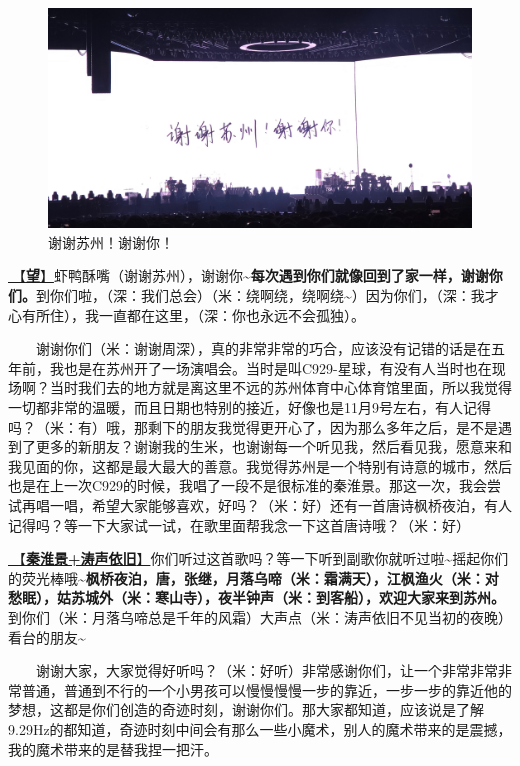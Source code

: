\documentclass[]{ctexbook}
\begin{document}
\begin{figure}

{\centering \includegraphics[width=400pt]{img/suzhou20241110/thank-suzhou} 

}

\caption{谢谢苏州！谢谢你！}\label{fig:unnamed-chunk-134}
\end{figure}

\hyperref[hope]{🎵【\textbf{望}】}虾鸭酥嘴（谢谢苏州），谢谢你\textasciitilde{}\textbf{每次遇到你们就像回到了家一样，谢谢你们。}到你们啦，（深：我们总会）（米：绕啊绕，绕啊绕\textasciitilde）因为你们，（深：我才心有所住），我一直都在这里，（深：你也永远不会孤独）。

  谢谢你们（米：谢谢周深），真的非常非常的巧合，应该没有记错的话是在五年前，我也是在苏州开了一场演唱会。当时是叫C929-星球，有没有人当时也在现场啊？当时我们去的地方就是离这里不远的苏州体育中心体育馆里面，所以我觉得一切都非常的温暖，而且日期也特别的接近，好像也是11月9号左右，有人记得吗？（米：有）哦，那剩下的朋友我觉得更开心了，因为那么多年之后，是不是遇到了更多的新朋友？谢谢我的生米，也谢谢每一个听见我，然后看见我，愿意来和我见面的你，这都是最大最大的善意。我觉得苏州是一个特别有诗意的城市，然后也是在上一次C929的时候，我唱了一段不是很标准的秦淮景。那这一次，我会尝试再唱一唱，希望大家能够喜欢，好吗？（米：好）还有一首唐诗枫桥夜泊，有人记得吗？等一下大家试一试，在歌里面帮我念一下这首唐诗哦？（米：好）

\hyperref[taoshengyijiu]{🎵【\textbf{秦淮景+涛声依旧}】}你们听过这首歌吗？等一下听到副歌你就听过啦\textasciitilde 摇起你们的荧光棒哦\textasciitilde{}\textbf{枫桥夜泊，唐，张继，月落乌啼（米：霜满天），江枫渔火（米：对愁眠），姑苏城外（米：寒山寺），夜半钟声（米：到客船），欢迎大家来到苏州。}到你们（米：月落乌啼总是千年的风霜）大声点（米：涛声依旧不见当初的夜晚）看台的朋友\textasciitilde{}

  谢谢大家，大家觉得好听吗？（米：好听）非常感谢你们，让一个非常非常非常普通，普通到不行的一个小男孩可以慢慢慢慢一步的靠近，一步一步的靠近他的梦想，这都是你们创造的奇迹时刻，谢谢你们。那大家都知道，应该说是了解9.29Hz的都知道，奇迹时刻中间会有那么一些小魔术，别人的魔术带来的是震撼，我的魔术带来的是替我捏一把汗。
\end{document}
